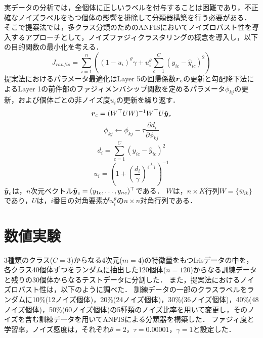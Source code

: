 \documentclass[twoside,twocolumn]{ujarticle}
\newcommand{\bmath}[1]{\mbox{\boldmath $#1$}}
\begin{document}

実データの分析では，全個体に正しいラベルを付与することは困難であり，不正確なノイズラベルをもつ個体の影響を排除して分類器構築を行う必要がある．
そこで提案法では，多クラス分類のためのANFISにおいてノイズロバスト性を導入するアプローチとして，ノイズファジィクラスタリングの概念を導入し，以下の目的関数の最小化を考える．
%
\begin{equation}
	J_{ranfis} = \sum_{i=1}^n \left( (1-u_i)^\theta \gamma + u_i^\theta \sum_{c=1}^C (y_{ic} - \hat{y}_{ic})^2 \right)
\end{equation}
%
提案法におけるパラメータ最適化はLayer 5の回帰係数$\bmath{r}_c$の更新と勾配降下法によるLayer 1の前件部のファジィメンバシップ関数を定めるパラメータ$\phi_{kj}$の更新，および個体ごとの非ノイズ度$u_i$の更新を繰り返す．
%
\begin{equation}
	\bmath{r}_c = (W^\top U W)^{-1} W^\top U \tilde{\bmath{y}}_c
	\label{eq: LSE of coefficient vector}
\end{equation}
%
\begin{equation}
	\phi_{kj} \leftarrow \phi_{kj} - \tau \frac{\partial d_i}{\partial \phi_{kj}}
	\label{eq: premise parameters learning}
\end{equation}
%
\begin{equation}
	d_i = \sum_{c=1}^C (y_{ic} - \hat{y}_{ic})^2
\end{equation}
%
\begin{equation}
	u_{i} = \left( 1 + \left( \frac{d_i}{\gamma} \right)^{\frac{1}{\theta-1}} \right)^{-1}
	\label{eq: non-noise membership calculation}
\end{equation}
%
$\tilde{\bmath{y}}_c$は，$n$次元ベクトル$\tilde{\bmath{y}}_c=(y_{1c}, \dots, y_{nc})^\top$である．
$W$は，$n \times K$行列$W=\{ \bar{w}_{ik} \}$であり，$U$は，$i$番目の対角要素が$u_i^\theta$の$n \times n$対角行列である．
%

\section{数値実験}

3種類のクラス($C=3$)からなる4次元($m=4$)の特徴量をもつIrisデータの中を，各クラス40個体ずつをランダムに抽出した120個体($n=120$)からなる訓練データと残りの30個体からなるテストデータに分割した．
また，提案法におけるノイズロバスト性は，以下のように調べた．
訓練データの一部のクラスラベルをランダムに10\%(12ノイズ個体)，20\%(24ノイズ個体)，30\%(36ノイズ個体)，40\%(48ノイズ個体)，50\%(60ノイズ個体)の5種類のノイズ比率を用いて変更し，そのノイズを含む訓練データを用いてANFISによる分類器を構築した．
ファジィ度と学習率，ノイズ感度は，それぞれ$\theta = 2$，$\tau = 0.00001$，$\gamma=1$と設定した．
\end{document}
